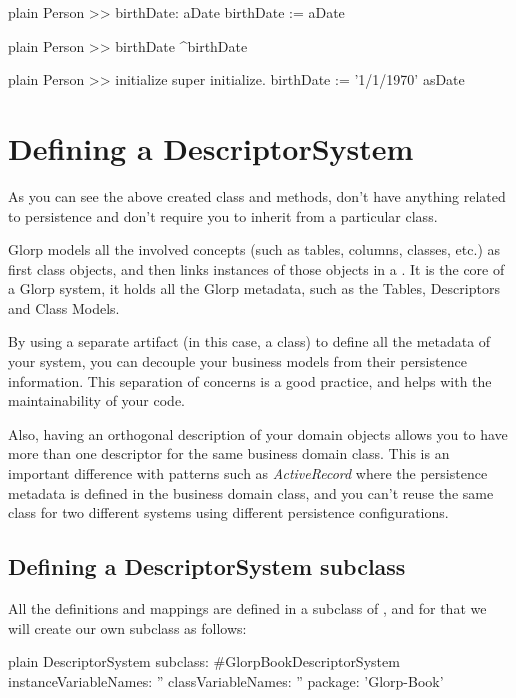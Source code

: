 \documentclass[10pt,twoside,english]{_support/latex/sbabook/sbabook}
\begin{document}
\begin{displaycode}{plain}
Person >> birthDate: aDate
	birthDate := aDate
\end{displaycode}

\begin{displaycode}{plain}
Person >> birthDate
	^birthDate
\end{displaycode}

\begin{displaycode}{plain}
Person >> initialize
	super initialize.
	birthDate := '1/1/1970' asDate
\end{displaycode}
\chapter{Defining a DescriptorSystem}
As you can see the above created class and methods, don't have anything
related to persistence and don't require you to inherit from a
particular class.

Glorp models all the involved concepts (such as tables, columns, classes, etc.)
as first class objects, and then links instances of those objects in a .
It is the core of a Glorp system, it holds all the Glorp metadata,
such as the Tables, Descriptors and Class Models.

By using a separate artifact (in this case, a class) to define all
the metadata of your system, you can decouple your business models
from their persistence information.
This separation of concerns is a good practice,
and helps with the maintainability of your code.

Also, having an orthogonal description of your domain objects allows you
to have more than one descriptor for the same business domain class.
This is an important difference with patterns such as \textit{ActiveRecord}
where the persistence metadata is defined in the business domain class,
and you can't reuse the same class for two different
systems using different persistence configurations.
\section{Defining a DescriptorSystem subclass}
All the definitions and mappings are defined in a subclass of
, and for that we will create our own subclass as follows:

\begin{displaycode}{plain}
DescriptorSystem subclass: #GlorpBookDescriptorSystem
	instanceVariableNames: ''
	classVariableNames: ''
	package: 'Glorp-Book'
\end{displaycode}
\end{document}
